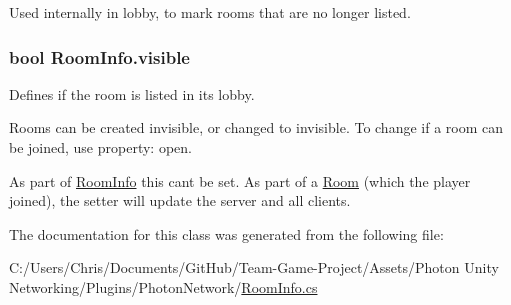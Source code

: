 Used internally in lobby, to mark rooms that are no longer listed.

\subsubsection[{\texorpdfstring{visible}{visible}}]{\setlength{\rightskip}{0pt plus 5cm}bool Room\+Info.\+visible\hspace{0.3cm}{\ttfamily [get]}}\hypertarget{class_room_info_addfd04015dca91382c6505cf0e7171f0}{}\label{class_room_info_addfd04015dca91382c6505cf0e7171f0}


Defines if the room is listed in its lobby. 

Rooms can be created invisible, or changed to invisible. To change if a room can be joined, use property\+: open. 

As part of \hyperlink{class_room_info}{Room\+Info} this can\textquotesingle{}t be set. As part of a \hyperlink{class_room}{Room} (which the player joined), the setter will update the server and all clients. 

The documentation for this class was generated from the following file\+:\begin{DoxyCompactItemize}
\item 
C\+:/\+Users/\+Chris/\+Documents/\+Git\+Hub/\+Team-\/\+Game-\/\+Project/\+Assets/\+Photon Unity Networking/\+Plugins/\+Photon\+Network/\hyperlink{_room_info_8cs}{Room\+Info.\+cs}\end{DoxyCompactItemize}
